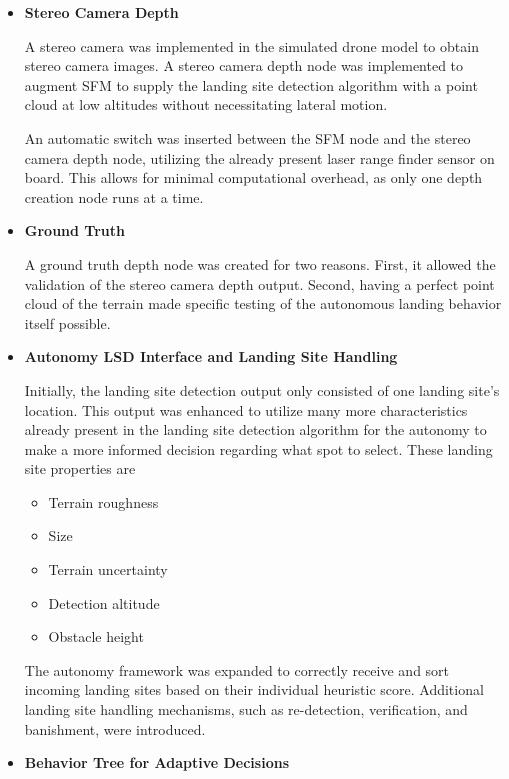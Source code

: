 \begin{itemize}
    \item \textbf{Stereo Camera Depth}

    A stereo camera was implemented in the simulated drone model to obtain stereo camera images. A stereo camera depth node was implemented to augment SFM to supply the landing site detection algorithm with a point cloud at low altitudes without necessitating lateral motion. 

    An automatic switch was inserted between the SFM node and the stereo camera depth node, utilizing the already present laser range finder sensor on board. This allows for minimal computational overhead, as only one depth creation node runs at a time.

    \item \textbf{Ground Truth}

    A ground truth depth node was created for two reasons. First, it allowed the validation of the stereo camera depth output. Second, having a perfect point cloud of the terrain made specific testing of the autonomous landing behavior itself possible.

    \item \textbf{Autonomy LSD Interface and Landing Site Handling}

    Initially, the landing site detection output only consisted of one landing site's location. This output was enhanced to utilize many more characteristics already present in the landing site detection algorithm for the autonomy to make a more informed decision regarding what spot to select. These landing site properties are
    
    \begin{itemize}
        \item Terrain roughness
        \item Size
        \item Terrain uncertainty
        \item Detection altitude
        \item Obstacle height
    \end{itemize}

    The autonomy framework was expanded to correctly receive and sort incoming landing sites based on their individual heuristic score. Additional landing site handling mechanisms, such as re-detection, verification, and banishment, were introduced.
    \item \textbf{Behavior Tree for Adaptive Decisions}


\end{itemize}
